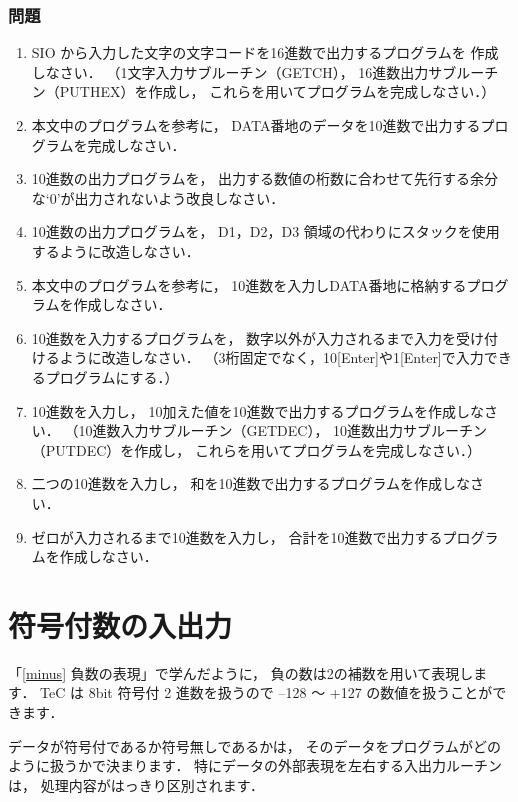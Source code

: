 \subsubsection{問題}
\begin{enumerate}
\item SIO から入力した文字の文字コードを16進数で出力するプログラムを
作成しなさい．
（1文字入力サブルーチン（GETCH），
16進数出力サブルーチン（PUTHEX）を作成し，
これらを用いてプログラムを完成しなさい．）
\item 本文中のプログラムを参考に，
DATA番地のデータを10進数で出力するプログラムを完成しなさい．
\item 10進数の出力プログラムを，
出力する数値の桁数に合わせて先行する余分な`0'が出力されないよう改良しなさい．
\item 10進数の出力プログラムを，
D1，D2，D3 領域の代わりにスタックを使用するように改造しなさい．
\item 本文中のプログラムを参考に，
10進数を入力しDATA番地に格納するプログラムを作成しなさい．
\item 10進数を入力するプログラムを，
数字以外が入力されるまで入力を受け付けるように改造しなさい．
（3桁固定でなく，10[Enter]や1[Enter]で入力できるプログラムにする．）
\item 10進数を入力し，
10加えた値を10進数で出力するプログラムを作成しなさい．
（10進数入力サブルーチン（GETDEC），
10進数出力サブルーチン（PUTDEC）を作成し，
これらを用いてプログラムを完成しなさい．）
\item 二つの10進数を入力し，
和を10進数で出力するプログラムを作成しなさい．
\item ゼロが入力されるまで10進数を入力し，
合計を10進数で出力するプログラムを作成しなさい．
\end{enumerate}

\newpage
\section{符号付数の入出力}

「\ref{minus} 負数の表現」で学んだように，
負の数は2の補数を用いて表現します．
TeC は 8bit 符号付 2 進数を扱うので
--128 〜 +127 の数値を扱うことができます．

データが符号付であるか符号無しであるかは，
そのデータをプログラムがどのように扱うかで決まります．
特にデータの外部表現を左右する入出力ルーチンは，
処理内容がはっきり区別されます．

